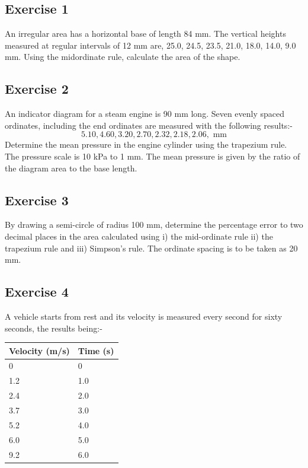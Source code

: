 \documentclass[
  english,
  11pt,
  oneside]{book}
\newcommand{\slide}{}
\theoremstyle{definition}
\theoremstyle{definition}
\theoremstyle{definition}
\theoremstyle{definition}
\theoremstyle{remark}
\begin{document}
\slide

\subsection*{Exercise 1}\label{exercise-1-7}

An irregular area has a horizontal base of length 84 mm. The vertical heights measured at regular intervals of 12 mm are, 25.0, 24.5, 23.5, 21.0, 18.0, 14.0, 9.0 mm. Using the midordinate rule, calculate the area of the shape.

\slide

\subsection*{Exercise 2}\label{exercise-2-7}

An indicator diagram for a steam engine is 90 mm long. Seven evenly spaced ordinates, including the end ordinates are measured with the following results:-
\[5.10, 4.60, 3.20, 2.70, 2.32, 2.18, 2.06, \text{ mm}\]
Determine the mean pressure in the engine cylinder using the trapezium rule. The pressure scale is 10 kPa to 1 mm. The mean pressure is given by the ratio of the diagram area to the base length.

\slide

\subsection*{Exercise 3}\label{exercise-3-5}

By drawing a semi-circle of radius 100 mm, determine the percentage error to two decimal places in the area calculated using i) the mid-ordinate rule ii) the trapezium rule and iii) Simpson's rule. The ordinate spacing is to be taken as 20 mm.

\slide

\subsection*{Exercise 4}\label{exercise-4-4}

A vehicle starts from rest and its velocity is measured every second for sixty seconds, the results being:-

\begin{tabular}{l|l}
\hline
Velocity (m/s) & Time (s)\\
\hline
0 & 0\\
\hline
1.2 & 1.0\\
\hline
2.4 & 2.0\\
\hline
3.7 & 3.0\\
\hline
5.2 & 4.0\\
\hline
6.0 & 5.0\\
\hline
9.2 & 6.0\\
\hline
\end{tabular}
\end{document}

